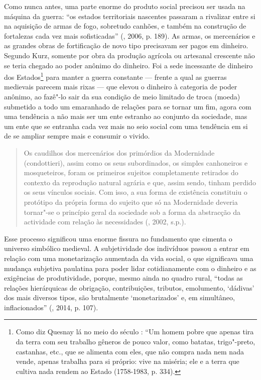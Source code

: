 Como nunca antes, uma parte enorme do produto social precisou ser usada
na máquina da guerra: ``os estados territoriais nascentes passaram a
rivalizar entre si na aquisição de armas de fogo, sobretudo canhões, e
também na construção de fortalezas cada vez mais sofisticadas'' (,
2006, p. 189). As armas, os mercenários e as grandes obras de
fortificação de novo tipo precisavam ser pagos em dinheiro. Segundo
Kurz, somente por obra da produção agrícola ou artesanal crescente não
se teria chegado ao poder anônimo do dinheiro. Foi a sede incessante de
dinheiro dos Estados\footnote{Como diz Quesnay lá no meio do século
  : ``Um homem pobre que apenas tira da terra com seu trabalho
  gêneros de pouco valor, como batatas, trigo"-preto, castanhas, etc.,
  que se alimenta com eles, que não compra nada nem nada vende, apenas
  trabalha para si próprio: vive na miséria; ele e a terra que cultiva
  nada rendem ao Estado (1758-1983, p. 334).} para manter a guerra
constante --- frente a qual as guerras medievais parecem mais rixas ---
que elevou o dinheiro à categoria de poder anônimo, ao fazê"-lo sair da
sua condição de meio limitado de troca (moeda) submetido a todo um
emaranhado de relações para se tornar um fim, agora com uma tendência a
não mais ser um ente estranho ao conjunto da sociedade, mas um ente que
se entranha cada vez mais no seio social com uma tendência em si de se
ampliar sempre mais e consumir o vivido.

\begin{quote}
Os caudilhos dos mercenários dos primórdios da Modernidade
(condottieri), assim como os seus subordinados, os simples canhoneiros e
mosqueteiros, foram os primeiros sujeitos completamente retirados do
contexto da reprodução natural agrária e que, assim sendo, tinham
perdido os seus vínculos sociais. Com isso, a sua forma de existência
constituiu o protótipo da própria forma do sujeito que só na Modernidade
deveria tornar"-se o princípio geral da sociedade sob a forma da
abstracção da actividade com relação às necessidades (, 2002, s.p.).
\end{quote}

Esse processo significou uma enorme fissura no fundamento que cimenta o
universo simbólico medieval. A subjetividade dos indivíduos passou a
entrar em relação com uma monetarização aumentada da vida social, o que
significava uma mudança subjetiva paulatina para poder lidar
cotidianamente com o dinheiro e as exigências de produtividade, porque,
mesmo ainda no quadro rural, ``todas as relações hierárquicas de
obrigação, contribuições, tributos, emolumento, `dádivas' dos mais
diversos tipos, são brutalmente `monetarizados' e, em simultâneo,
inflacionados'' (, 2014, p. 107).

